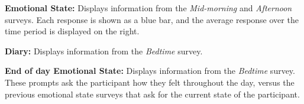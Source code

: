 \documentclass{article}
\begin{document}
{\bf Emotional State:} Displays information from the \emph{Mid-morning} and \emph{Afternoon} surveys.  Each response
	is shown as a blue bar, and the average response over the time period is displayed on the right.

{\bf Diary:} Displays information from the \emph{Bedtime} survey.

{\bf End of day Emotional State:} Displays information from the \emph{Bedtime} survey.  These prompts ask the participant
	how they felt throughout the day, versus the previous emotional state surveys that ask for the current state of the participant.
\end{document}
